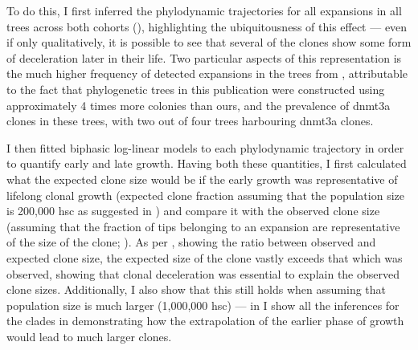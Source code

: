 \begin{figure}[!ht]
	\label{fig:exceeds-within-lifetime-representation}
\end{figure}

To do this, I first inferred the phylodynamic trajectories for all expansions in all trees across both cohorts (), highlighting the ubiquitousness of this effect --- even if only qualitatively, it is possible to see that several of the clones show some form of deceleration later in their life. Two particular aspects of this representation is the much higher frequency of detected expansions in the trees from , attributable to the fact that phylogenetic trees in this publication were constructed using approximately 4 times more colonies than ours, and the prevalence of \ac{dnmt3a} clones in these trees, with two out of four trees harbouring \ac{dnmt3a} clones.

\begin{figure}[!ht]
	\label{fig:trajectories-fabre-mitchell}
\end{figure}

I then fitted biphasic log-linear models to each phylodynamic trajectory in order to quantify early and late growth. Having both these quantities, I first calculated what the expected clone size would be if the early growth was representative of lifelong clonal growth (expected clone fraction assuming that the population size is 200,000 \ac{hsc} as suggested in \cite{Lee-Six2018-lp}) and compare it with the observed clone size (assuming that the fraction of tips belonging to an expansion are representative of the size of the clone; ). As per , showing the ratio between observed and expected clone size, the expected size of the clone vastly exceeds that which was observed, showing that clonal deceleration was essential to explain the observed clone sizes. Additionally, I also show that this still holds when assuming that population size is much larger (1,000,000 \ac{hsc}) --- in  I show all the inferences for the clades in  demonstrating how the extrapolation of the earlier phase of growth would lead to much larger clones.

